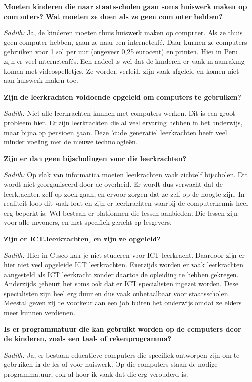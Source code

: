 \textbf{Moeten kinderen die naar staatsscholen gaan soms huiswerk maken op computers? Wat moeten ze doen als ze geen computer hebben?}

\textit{Sadith:} Ja, de kinderen moeten thuis huiswerk maken op computer. Als ze thuis geen computer hebben, gaan ze naar een internetcafé. Daar kunnen ze computers gebruiken voor 1 sol per uur (ongeveer 0,25 eurocent) en printen. Hier in Peru zijn er veel internetcafés. Een nadeel is wel dat de kinderen er vaak in aanraking komen met videospelletjes. Ze worden verleid, zijn vaak afgeleid en komen niet aan huiswerk maken toe. 

\textbf{Zijn de leerkrachten voldoende opgeleid om computers te gebruiken?}

\textit{Sadith:} Niet alle leerkrachten kunnen met computers werken. Dit is een groot probleem hier. Er zijn leerkrachten die al veel ervaring hebben in het onderwijs, maar bijna op pensioen gaan. Deze 'oude generatie' leerkrachten heeft veel minder voeling met de nieuwe technologieën.

\textbf{Zijn er dan geen bijscholingen voor die leerkrachten?}

\textit{Sadith:} Op vlak van informatica moeten leerkrachten vaak zichzelf bijscholen. Dit wordt niet georganiseerd door de overheid. Er wordt dus verwacht dat de leerkrachten zelf op zoek gaan, en ervoor zorgen dat ze zelf op de hoogte zijn. In realiteit loop dit vaak fout en zijn er leerkrachten waarbij de computerkennis heel erg beperkt is. Wel bestaan er platformen die lessen aanbieden. Die lessen zijn voor alle inwoners, en niet specifiek gericht op lesgevers.

\textbf{Zijn er ICT-leerkrachten, en zijn ze opgeleid?}

\textit{Sadith:} Hier in Cusco kan je niet studeren voor ICT leerkracht. Daardoor zijn er hier niet veel opgeleide ICT leerkrachten. Enerzijds worden er vaak leerkrachten aangesteld als ICT leerkracht zonder daartoe de opleiding te hebben gekregen. Anderzijds gebeurt het soms ook dat er ICT specialisten ingezet worden. Deze specialisten zijn heel erg duur en dus vaak onbetaalbaar voor staatsscholen. Meestal geven zij de voorkeur aan een job buiten het onderwijs omdat ze elders meer kunnen verdienen. 

\textbf{Is er programmatuur die kan gebruikt worden op de computers door de kinderen, zoals een taal- of rekenprogramma?}

\textit{Sadith:} Ja, er bestaan educatieve computers die specifiek ontworpen zijn om te gebruiken in de les of voor huiswerk. Op die computers staan de nodige programmatuur, ook al hoor ik vaak dat die erg verouderd is.
	
